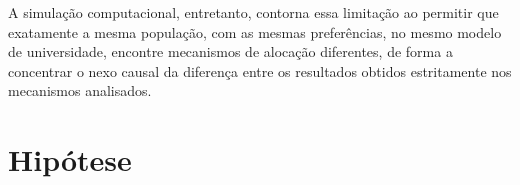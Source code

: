 \documentclass[
    12pt,
    openany,
    oneside,
    a4paper,
    english,
    brazil
]{abntex2}
\begin{document}
A simulação computacional, entretanto, contorna essa limitação ao permitir que exatamente a mesma população, com as mesmas preferências, no mesmo modelo de universidade, encontre mecanismos de alocação diferentes, de forma a concentrar o nexo causal da diferença entre os resultados obtidos estritamente nos mecanismos analisados.




\section{Hipótese}
\label{sec:hipotese}
\end{document}
